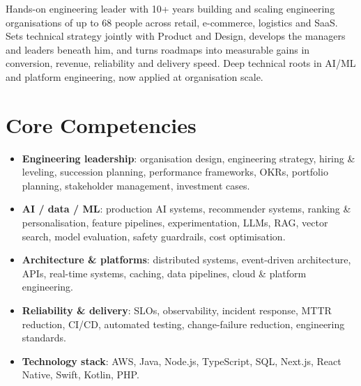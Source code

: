 \documentclass[11pt,a4paper,sans]{moderncv}
\begin{document}
\makecvtitle


\vspace{6pt}
\small{Hands-on engineering leader with 10+ years building and scaling engineering organisations of up to 68 people across retail, e-commerce, logistics and SaaS. Sets technical strategy jointly with Product and Design, develops the managers and leaders beneath him, and turns roadmaps into measurable gains in conversion, revenue, reliability and delivery speed. Deep technical roots in AI/ML and platform engineering, now applied at organisation scale.}


\section{Core Competencies}
\vspace{1pt}
\begin{itemize}

\item \textbf{Engineering leadership}: organisation design, engineering strategy, hiring \& leveling, succession planning, performance frameworks, OKRs, portfolio planning, stakeholder management, investment cases.

\item \textbf{AI / data / ML}: production AI systems, recommender systems, ranking \& personalisation, feature pipelines, experimentation, LLMs, RAG, vector search, model evaluation, safety guardrails, cost optimisation.

\item \textbf{Architecture \& platforms}: distributed systems, event-driven architecture, APIs, real-time systems, caching, data pipelines, cloud \& platform engineering.

\item \textbf{Reliability \& delivery}: SLOs, observability, incident response, MTTR reduction, CI/CD, automated testing, change-failure reduction, engineering standards.

\item \textbf{Technology stack}: AWS, Java, Node.js, TypeScript, SQL, Next.js, React Native, Swift, Kotlin, PHP.

\end{itemize}
\end{document}
